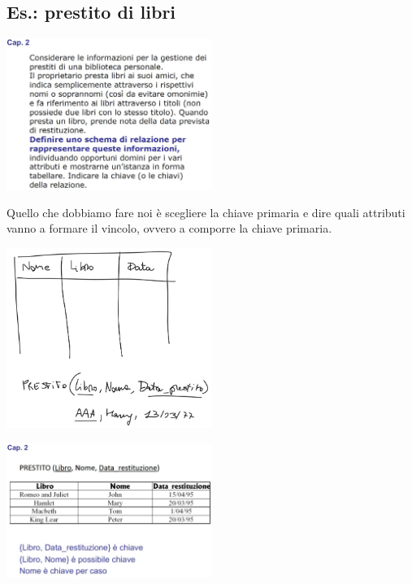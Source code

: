 \subsection{Es.: prestito di libri}
\begin{center}
    \includegraphics[width=0.5\textwidth]{img/MR_es_prestitolibri1.jpg}
\end{center}
Quello che dobbiamo fare noi è scegliere la chiave primaria e dire quali attributi vanno a formare il vincolo, ovvero a comporre la chiave primaria.
\begin{center}
    \includegraphics[width=0.5\textwidth]{img/MR_es_prestitolibri2.jpg}
\end{center}
\begin{center}
    \includegraphics[width=0.5\textwidth]{img/MR_es_prestitolibri3.jpg} 
\end{center}

